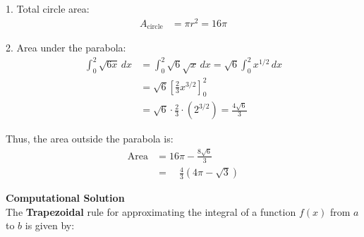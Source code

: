 \documentclass[journal]{IEEEtran}
\begin{document}
1. Total circle area:
\begin{align*}
A_{\text{circle}} &= \pi r^2 = 16\pi
\end{align*}

2. Area under the parabola:
\begin{align*}
\int_0^2 \sqrt{6x} \, dx &= \int_0^2 \sqrt{6} \sqrt{x} \, dx = \sqrt{6} \int_0^2 x^{1/2} \, dx \\
&= \sqrt{6} \left[\frac{2}{3}x^{3/2}\right]_0^2 \\
&= \sqrt{6} \cdot \frac{2}{3} \cdot (2^{3/2}) = \frac{4\sqrt{6}}{3}
\end{align*}

Thus, the area outside the parabola is:
\begin{align*}
\text{Area} &= 16\pi - \frac{8\sqrt{6}}{3} \\
&= \quad \frac{4}{3}(4\pi - \sqrt{3})
\end{align*}




\textbf{Computational Solution}\\

The \textbf{Trapezoidal} rule for approximating the integral of a function \(f(x)\) from \(a\) to \(b\) is given by:
\end{document}
